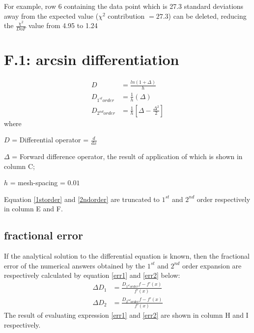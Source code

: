 \documentclass[a4paper, 12pt]{article}
\begin{document}
For example, row 6 containing the data point which is 27.3 standard deviations away from the expected value ($\chi^2$ contribution $= 27.3$) can be deleted, reducing the $\frac{\chi^2}{DoF}$ value from 4.95 to 1.24

\section{F.1: arcsin differentiation}
\begin{align}
  D &= \frac{ln(1+\Delta)}{h}  							\\
  D_{1^{st}order}  &= \frac{1}{h} (\Delta)                      \label{1storder} \\
  D_{2^{nd}order}  &= \frac{1}{h} [\Delta-\frac{\Delta^2}{2}]   \label{2ndorder}
\end{align}
where

$D$ = Differential operator = $\frac{d}{dx}$

$\Delta$ = Forward difference operator, the result of application of which is shown in column C;

$h$ = mesh-spacing = $0.01$

Equation \ref{1storder} and \ref{2ndorder} are truncated to $1^{st}$ and $2^{nd}$ order respectively in column E and F.

\subsection{fractional error}
If the analytical solution to the differential equation is known, then the fractional error of the numerical answers obtained by the $1^{st}$ and $2^{nd}$ order expansion are respectively calculated by equation \ref{err1} and \ref{err2} below:
\begin{align}
\Delta D_1 &= \frac{D_{1^{st}order}f-f'(x)}{f'(x)} \label{err1}\\
\Delta D_2 &= \frac{D_{2^{nd}order}f-f'(x)}{f'(x)} \label{err2}
\end{align}
The result of evaluating expression \ref{err1} and \ref{err2} are shown in column H and I respectively.
\end{document}
